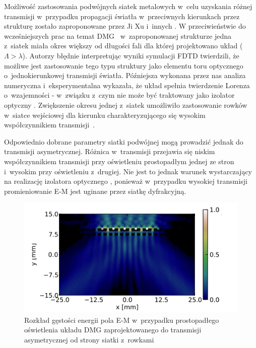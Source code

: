 Możliwość zastosowania podwójnych siatek metalowych w~celu uzyskania różnej transmisji w~przypadku propagacji światła w~przeciwnych kierunkach przez strukturę zostało zaproponowane przez Ji Xu i~innych \cite{xu2011unidirectional}. W przeciwieństwie do wcześniejszych prac na temat DMG~\cite{cheng2007controllable,cheng2008physical,chan2006optical} w~zaproponowanej strukturze jedna z~siatek miała okres większy od długości fali dla której projektowano układ ($\Lambda>\lambda$). Autorzy błędnie interpretując wyniki symulacji FDTD twierdzili, że możliwe jest zastosowanie tego typu struktury jako elementu toru optycznego o~jednokierunkowej transmisji światła. Późniejsza wykonana przez nas analiza numeryczna i~eksperymentalna wykazała, że układ spełnia twierdzenie Lorenza o~wzajemności - w~związku z~czym nie może być  traktowany jako izolator optyczny \cite{jalas2013and}. Zwiększenie okresu jednej z~siatek umożliwiło zastosowanie rowków w~siatce wejściowej dla kierunku charakteryzującego się wysokim współczynnikiem transmisji~\cite{xu2011unidirectional}.

Odpowiednio dobrane parametry siatki podwójnej mogą prowadzić jednak do transmisji asymetrycznej. Różnica w~transmisji przejawia się niskim współczynnikiem transmisji przy oświetleniu prostopadłym jednej ze stron i~wysokim przy oświetleniu z~drugiej. Nie jest to jednak warunek wystarczający na realizację izolatora optycznego \cite{jalas2013and}, ponieważ w~przypadku wysokiej transmisji promieniowanie E-M jest uginane przez siatkę dyfrakcyjną. 

\begin{figure}[tb]
	\includegraphics[width=\textwidth]{images/thz/opt_lett_gora.png}
	\caption{Rozkład gęstości energii pola E-M w~przypadku prostopadłego oświetlenia układu DMG zaprojektowanego do transmisji asymetrycznej od strony siatki z~rowkami~\cite{Stolarek:13}}
	\label{fig:trans_gora}
\end{figure}

